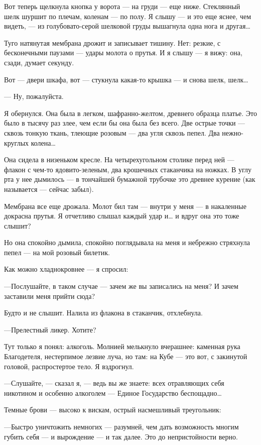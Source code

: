 \documentclass[11pt,openany]{book}
\begin{document}
Вот теперь щелкнула кнопка у ворота --- на груди --- еще ниже. Стеклянный шелк шуршит по плечам, коленам --- по полу. Я слышу --- и это еще яснее, чем видеть, --- из голубовато-серой шелковой груды вышагнула одна нога и другая\ldots{}

Туго натянутая мембрана дрожит и записывает тишину. Нет: резкие, с бесконечными паузами --- удары молота о прутья. И я слышу --- я вижу: она, сзади, думает секунду.

Вот --- двери шкафа, вот --- стукнула какая-то крышка --- и снова шелк, шелк\ldots{}

--- Ну, пожалуйста.

Я обернулся. Она была в легком, шафранно-желтом, древнего образца платье. Это было в тысячу раз злее, чем если бы она была без всего. Две острые точки --- сквозь тонкую ткань, тлеющие розовым --- два угля сквозь пепел. Два нежно-круглых колена\ldots{}

Она сидела в низеньком кресле. На четырехугольном столике перед ней --- флакон с чем-то ядовито-зеленым, два крошечных стаканчика на ножках. В углу рта у нее дымилось --- в тончайшей бумажной трубочке это древнее курение (как называется --- сейчас забыл).

Мембрана все еще дрожала. Молот бил там --- внутри у меня --- в накаленные докрасна прутья. Я отчетливо слышал каждый удар и\ldots{} и вдруг она это тоже слышит?

Но она спокойно дымила, спокойно поглядывала на меня и небрежно стряхнула пепел --- на мой розовый билетик.

Как можно хладнокровнее --- я спросил:

---Послушайте, в таком случае --- зачем же вы записались на меня? И зачем заставили меня прийти сюда?

Будто и не слышит. Налила из флакона в стаканчик, отхлебнула.

---Прелестный ликер. Хотите?

Тут только я понял: алкоголь. Молнией мелькнуло вчерашнее: каменная рука Благодетеля, нестерпимое лезвие луча, но там: на Кубе --- это вот, с закинутой головой, распростертое тело. Я вздрогнул.

---Слушайте, --- сказал я, --- ведь вы же знаете: всех отравляющих себя никотином и особенно алкоголем --- Единое Государство беспощадно\ldots{}

Темные брови --- высоко к вискам, острый насмешливый треугольник:

---Быстро уничтожить немногих --- разумней, чем дать возможность многим губить себя --- и вырождение --- и так далее. Это до непристойности верно.
\end{document}
